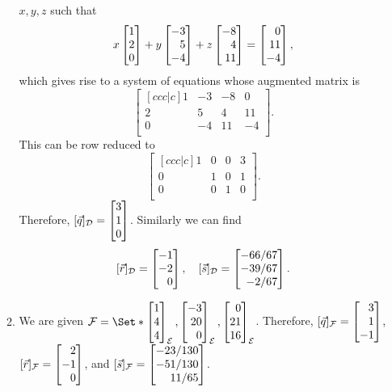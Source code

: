\begin{exercises}
\begin{problist}
\begin{solution}
\begin{enumerate}
\begin{enumerate}
							$x, y, z$ such that
							\[
								x \mat{1\\2\\0} + y \mat{-3\\5\\-4} +z 
								\mat{-8\\4\\11} = \mat{0\\11\\-4},
							\]
							which gives rise to a system of equations whose augmented matrix is 
							\[
								\begin{bmatrix}[ccc|c]
									1 & -3 & -8 & 0\\
									2 & 5 & 4 & 11\\
									0 & -4 & 11 & -4\\
								\end{bmatrix}.
							\]
							This can be row reduced to
							\[
								\begin{bmatrix}[ccc|c]
									1 & 0 & 0 & 3\\
									0 & 1 & 0 & 1\\
									0 & 0 & 1 & 0\\
								\end{bmatrix}.
							\]
							Therefore, $[\vec{q}]_{\mathcal{D}} = \mat{3\\1\\0}$. Similarly we can find 
							\[
								[\vec{r}]_{\mathcal{D}} = \mat{-1\\-2\\0},\quad [\vec{s}]_{\mathcal{D}} = \mat{-66/67\\-39/67\\-2/67}.
							\]
						\item We are given $\mathcal{F} = \Set*{ \mat{1\\4\\4}_{\mathcal{E}}, \mat{-3\\20\\0}_{\mathcal{E}}, 
							\mat{0\\21\\16}_{\mathcal{E}}}$. Therefore,
							$[\vec{q}]_{\mathcal{F}} = \mat{3 \\ 1 \\ -1}$,
							$[\vec{r}]_{\mathcal{F}} = \mat{2 \\ -1 \\0}$,
							and $[\vec{s}]_{\mathcal{F}} = \mat{-23/130\\-51/130\\11/65}$.
					\end{enumerate}
			\end{enumerate}
		\end{solution}


\end{problist}
\end{exercises}
